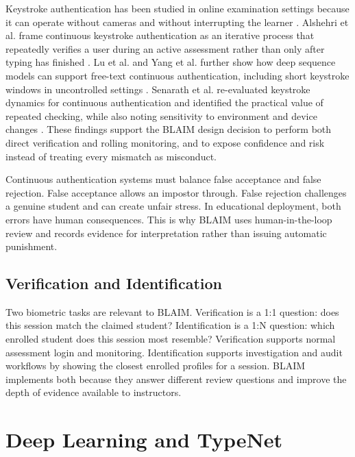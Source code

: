 Keystroke authentication has been studied in online examination settings because it can operate without cameras and without interrupting the learner \cite{mattsson2020keystroke}. Alshehri et al. frame continuous keystroke authentication as an iterative process that repeatedly verifies a user during an active assessment rather than only after typing has finished \cite{alshehri2018iterative}. Lu et al. and Yang et al. further show how deep sequence models can support free-text continuous authentication, including short keystroke windows in uncontrolled settings \cite{lu2020continuous,yang2021tkca}. Senarath et al. re-evaluated keystroke dynamics for continuous authentication and identified the practical value of repeated checking, while also noting sensitivity to environment and device changes \cite{senarath2023reevaluating}. These findings support the BLAIM design decision to perform both direct verification and rolling monitoring, and to expose confidence and risk instead of treating every mismatch as misconduct.

Continuous authentication systems must balance false acceptance and false rejection. False acceptance allows an impostor through. False rejection challenges a genuine student and can create unfair stress. In educational deployment, both errors have human consequences. This is why BLAIM uses human-in-the-loop review and records evidence for interpretation rather than issuing automatic punishment.

\subsection{Verification and Identification}
\label{subsec:verification-identification}

Two biometric tasks are relevant to BLAIM. Verification is a 1:1 question: does this session match the claimed student? Identification is a 1:N question: which enrolled student does this session most resemble? Verification supports normal assessment login and monitoring. Identification supports investigation and audit workflows by showing the closest enrolled profiles for a session. BLAIM implements both because they answer different review questions and improve the depth of evidence available to instructors.

\section{Deep Learning and TypeNet}
\label{sec:lit-typenet}

